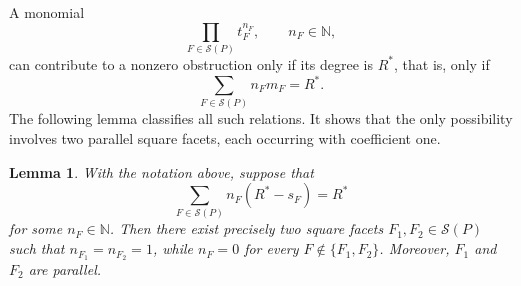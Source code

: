 \documentclass[11pt]{amsart}
\numberwithin{equation}{section}
\theoremstyle{plain}
\newtheorem{lemma}[theorem]{Lemma}
\theoremstyle{definition}
\newcommand{\0}{$0$-mutable}
\newcommand{\NN}{\ensuremath{\mathbb{N}}}
\renewcommand{\1}{$1$-rigid}
\renewcommand{\0}{$0$-mutable}
\begin{document}
A monomial
\[
\prod_{F\in\mathcal S(P)}t_F^{n_F},
\qquad n_F\in\NN,
\]
can contribute to a nonzero obstruction only if its degree is \(R^*\),
that is, only if
\[
\sum_{F\in\mathcal S(P)}n_Fm_F=R^*.
\]
The following lemma classifies all such relations. It shows that the
only possibility involves two parallel square facets, each occurring
with coefficient one.

{
\begin{lemma}\label{lem square relation}
With the notation above, suppose that
\[
\sum_{F\in\mathcal S(P)}n_F(R^*-s_F)=R^*
\]
for some \(n_F\in\NN\). Then there exist precisely two square facets
\(F_1,F_2\in\mathcal S(P)\) such that
\(n_{F_1}=n_{F_2}=1\), while \(n_F=0\) for every
\(F\notin\{F_1,F_2\}\). Moreover, \(F_1\) and \(F_2\) are parallel.
\end{lemma}
}
\end{document}
